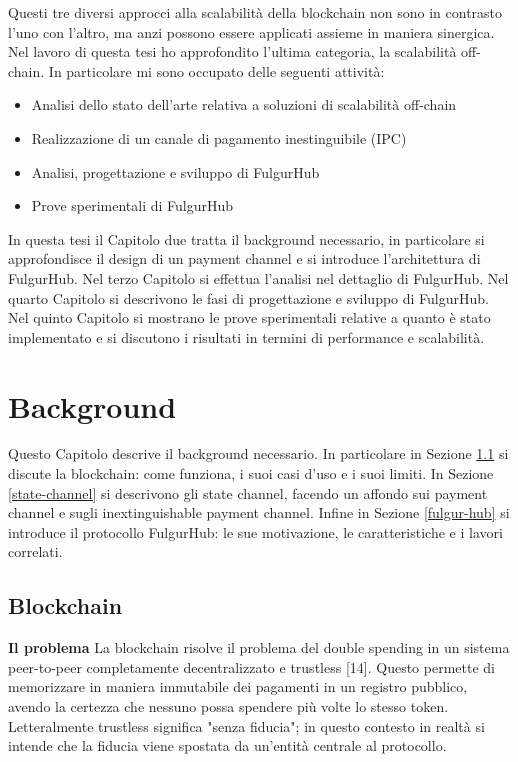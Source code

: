 \documentclass[12pt,italian,]{book}
\providecommand{\tightlist}{%
  \setlength{\itemsep}{0pt}\setlength{\parskip}{0pt}}
\begin{document}
Questi tre diversi approcci alla scalabilità della blockchain non sono in contrasto l'uno con l'altro, ma anzi possono essere applicati assieme in maniera sinergica. Nel lavoro di questa tesi ho approfondito l'ultima categoria, la scalabilità off-chain. In particolare mi sono occupato delle seguenti attività:

\begin{itemize}
\tightlist
\item
  Analisi dello stato dell'arte relativa a soluzioni di scalabilità off-chain
\item
  Realizzazione di un canale di pagamento inestinguibile (IPC)
\item
  Analisi, progettazione e sviluppo di FulgurHub
\item
  Prove sperimentali di FulgurHub
\end{itemize}

In questa tesi il Capitolo due tratta il background necessario, in particolare si approfondisce il design di un payment channel e si introduce l'architettura di FulgurHub. Nel terzo Capitolo si effettua l'analisi nel dettaglio di FulgurHub. Nel quarto Capitolo si descrivono le fasi di progettazione e sviluppo di FulgurHub. Nel quinto Capitolo si mostrano le prove sperimentali relative a quanto è stato implementato e si discutono i risultati in termini di performance e scalabilità.

\hypertarget{background}{%
\chapter{Background}\label{background}}

Questo Capitolo descrive il background necessario. In particolare in Sezione \ref{blockchain} si discute la blockchain: come funziona, i suoi casi d'uso e i suoi limiti. In Sezione \ref{state-channel} si descrivono gli state channel, facendo un affondo sui payment channel e sugli inextinguishable payment channel. Infine in Sezione \ref{fulgur-hub} si introduce il protocollo FulgurHub: le sue motivazione, le caratteristiche e i lavori correlati.

\hypertarget{blockchain}{%
\section{Blockchain}\label{blockchain}}

\textbf{\textbf{Il problema}} La blockchain risolve il problema del double spending in un sistema peer-to-peer completamente decentralizzato e trustless {[}14{]}. Questo permette di memorizzare in maniera immutabile dei pagamenti in un registro pubblico, avendo la certezza che nessuno possa spendere più volte lo stesso token. Letteralmente trustless significa "senza fiducia"; in questo contesto in realtà si intende che la fiducia viene spostata da un'entità centrale al protocollo.
\end{document}
